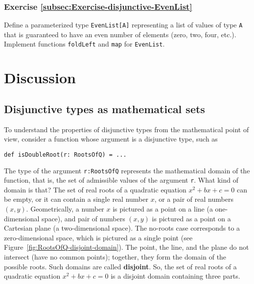 \subsubsection{Exercise \label{subsec:Exercise-disjunctive-EvenList}\ref{subsec:Exercise-disjunctive-EvenList}}

Define a parameterized type \lstinline!EvenList[A]! representing
a list of values of type \lstinline!A! that is guaranteed to have
an even number of elements (zero, two, four, etc.). Implement functions
\lstinline!foldLeft! and \lstinline!map! for \lstinline!EvenList!.%
\begin{comment}
Solution:
\begin{lstlisting}
sealed trait EvenList[A]
final case class Lempty[A]() extends EvenList[A]
final case class Lpair[A](x: A, y: A, tail: EvenList[A]) extends EvenList

def fmap[A, B](f: A => B): EvenList[A] => EvenList[B] = {
case Lempty() => Lempty[B]()
case Lpair(x, y, tail) => Lpair[B](f(x), f(y), fmap(f)(tail))
}
\end{lstlisting}
\end{comment}


\section{Discussion}

\subsection{Disjunctive types as mathematical sets}

To understand the properties of disjunctive types from the mathematical
point of view, consider a function whose argument is a disjunctive
type, such as
\begin{lstlisting}
def isDoubleRoot(r: RootsOfQ) = ...
\end{lstlisting}
The type of the argument \lstinline!r:RootsOfQ! represents the mathematical
domain of the function, that is, the set of admissible values of the
argument \lstinline!r!. What kind of domain is that? The set of real
roots of a quadratic equation $x^{2}+bx+c=0$ can be empty, or it
can contain a single real number $x$, or a pair of real numbers $\left(x,y\right)$.
Geometrically, a number $x$ is pictured as a point on a line (a one-dimensional
space), and pair of numbers $\left(x,y\right)$ is pictured as a point
on a Cartesian plane (a two-dimensional space). The no-roots case
corresponds to a zero-dimensional space, which is pictured as a single
point (see Figure~\ref{fig:RootsOfQ-disjoint-domain}). The point,
the line, and the plane do not intersect (have no common points);
together, they form the domain of the possible roots. Such domains
are called \textbf{disjoint}. So, the set
of real roots of a quadratic equation $x^{2}+bx+c=0$ is a disjoint
domain containing three parts.

